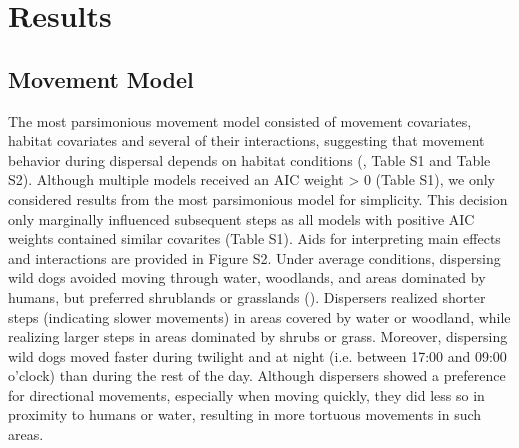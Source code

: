\documentclass[abstract=on,10pt,a4paper,bibliography=totocnumbered]{article}
\begin{document}
\section{Results}
\subsection{Movement Model}
The most parsimonious movement model consisted of movement covariates, habitat
covariates and several of their interactions, suggesting that movement behavior
during dispersal depends on habitat conditions (, Table S1
and Table S2). Although multiple models received an AIC weight > 0 (Table S1),
we only considered results from the most parsimonious model for simplicity. This
decision only marginally influenced subsequent steps as all models with positive
AIC weights contained similar covarites (Table S1). Aids for interpreting main
effects and interactions are provided in Figure S2. Under average conditions,
dispersing wild dogs avoided moving through water, woodlands, and areas
dominated by humans, but preferred shrublands or grasslands
(). Dispersers realized shorter steps (indicating slower
movements) in areas covered by water or woodland, while realizing larger steps
in areas dominated by shrubs or grass. Moreover, dispersing wild dogs moved
faster during twilight and at night (i.e. between 17:00 and 09:00 o'clock) than
during the rest of the day. Although dispersers showed a preference for
directional movements, especially when moving quickly, they did less so in
proximity to humans or water, resulting in more tortuous movements in such
areas.
\end{document}
